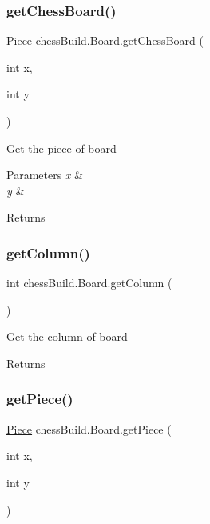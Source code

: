 \subsubsection{\texorpdfstring{get\+Chess\+Board()}{getChessBoard()}}
{\footnotesize\ttfamily \hyperlink{classchess_build_1_1_piece}{Piece} chess\+Build.\+Board.\+get\+Chess\+Board (\begin{DoxyParamCaption}\item[{int}]{x,  }\item[{int}]{y }\end{DoxyParamCaption})}

Get the piece of board 
\begin{DoxyParams}{Parameters}
{\em x} & \\
\hline
{\em y} & \\
\hline
\end{DoxyParams}
\begin{DoxyReturn}{Returns}

\end{DoxyReturn}
\mbox{\label{classchess_build_1_1_board_a90f2eeba043a2a1524e350a745610da7}} 
\subsubsection{\texorpdfstring{get\+Column()}{getColumn()}}
{\footnotesize\ttfamily int chess\+Build.\+Board.\+get\+Column (\begin{DoxyParamCaption}{ }\end{DoxyParamCaption})}

Get the column of board \begin{DoxyReturn}{Returns}

\end{DoxyReturn}
\mbox{\label{classchess_build_1_1_board_ad0b01d5dfb0e517bc41593f57d2cc073}} 
\subsubsection{\texorpdfstring{get\+Piece()}{getPiece()}}
{\footnotesize\ttfamily \hyperlink{classchess_build_1_1_piece}{Piece} chess\+Build.\+Board.\+get\+Piece (\begin{DoxyParamCaption}\item[{int}]{x,  }\item[{int}]{y }\end{DoxyParamCaption})}

